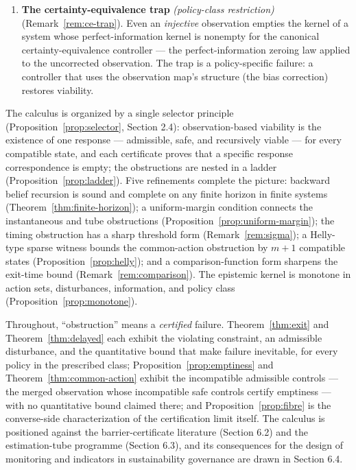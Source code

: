\documentclass[10pt,twocolumn]{article}
\theoremstyle{definition}
\begin{document}
\begin{enumerate}
  \textbf{The fibre certification criterion} \emph{(finitely checkable)} (Proposition~\ref{prop:fibre}, Corollary~\ref{cor:certainly-safe}).
  An exact observation-only safety certifier --- a function of the
  observation that returns ``safe'' exactly on the safe set --- exists
  if and only if safe-set membership is constant on every observation
  fibre. The certainly-safe set is the sound relaxation: the largest set
  of observations that can be labeled safe without further information.
\item
  \textbf{The certainty-equivalence trap} \emph{(policy-class restriction)} (Remark~\ref{rem:ce-trap}). Even an
  \emph{injective} observation empties the kernel of a system whose
  perfect-information kernel is nonempty for the canonical
  certainty-equivalence controller --- the perfect-information zeroing
  law applied to the uncorrected observation. The trap is a
  policy-specific failure: a controller that uses the observation map's
  structure (the bias correction) restores viability.
\end{enumerate}

The calculus is organized by a single selector principle (Proposition~\ref{prop:selector}, Section 2.4):
observation-based viability is the existence of one response ---
admissible, safe, and recursively viable --- for every compatible state,
and each certificate proves that a specific response correspondence is
empty; the obstructions are nested in a ladder
(Proposition~\ref{prop:ladder}). Five refinements complete the picture:
backward belief recursion is sound and complete on any finite horizon
in finite systems (Theorem~\ref{thm:finite-horizon}); a uniform-margin
condition connects the instantaneous and tube obstructions
(Proposition~\ref{prop:uniform-margin}); the timing obstruction has a
sharp threshold form (Remark~\ref{rem:sigma}); a Helly-type sparse
witness bounds the common-action obstruction by \(m+1\) compatible
states (Proposition~\ref{prop:helly}); and a comparison-function form
sharpens the exit-time bound (Remark~\ref{rem:comparison}). The epistemic kernel is monotone in
action sets, disturbances, information, and policy class
(Proposition~\ref{prop:monotone}).

Throughout, ``obstruction'' means a \emph{certified} failure. Theorem~\ref{thm:exit} and Theorem~\ref{thm:delayed} each exhibit the violating constraint, an admissible disturbance,
and the quantitative bound that make failure inevitable, for every policy in the prescribed class; Proposition~\ref{prop:emptiness} and Theorem~\ref{thm:common-action} exhibit the incompatible
admissible controls --- the merged observation whose incompatible safe
controls certify emptiness --- with no quantitative bound claimed there;
and Proposition~\ref{prop:fibre} is the converse-side characterization of the certification
limit itself. The calculus is positioned against
the barrier-certificate literature (Section 6.2) and the estimation-tube
programme (Section 6.3), and its consequences for the design of
monitoring and indicators in sustainability governance are drawn in
Section 6.4.
\end{document}
